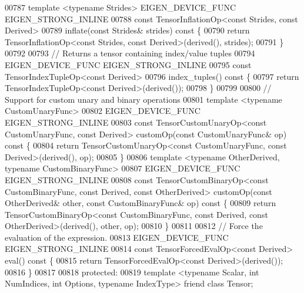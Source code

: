 \begin{DoxyCode}
00787     \textcolor{keyword}{template} <\textcolor{keyword}{typename} Str\textcolor{keywordtype}{id}es> EIGEN\_DEVICE\_FUNC EIGEN\_STRONG\_INLINE
00788     \textcolor{keyword}{const} TensorInflationOp<const Strides, const Derived>
00789     inflate(\textcolor{keyword}{const} Strides& strides)\textcolor{keyword}{ const }\{
00790       \textcolor{keywordflow}{return} TensorInflationOp<const Strides, const Derived>(derived(), strides);
00791     \}
00792 
00793     \textcolor{comment}{// Returns a tensor containing index/value tuples}
00794     EIGEN\_DEVICE\_FUNC EIGEN\_STRONG\_INLINE
00795     \textcolor{keyword}{const} TensorIndexTupleOp<const Derived>
00796     index\_tuples()\textcolor{keyword}{ const }\{
00797       \textcolor{keywordflow}{return} TensorIndexTupleOp<const Derived>(derived());
00798     \}
00799 
00800     \textcolor{comment}{// Support for custom unary and binary operations}
00801     \textcolor{keyword}{template} <\textcolor{keyword}{typename} CustomUnaryFunc>
00802     EIGEN\_DEVICE\_FUNC EIGEN\_STRONG\_INLINE
00803     \textcolor{keyword}{const} TensorCustomUnaryOp<const CustomUnaryFunc, const Derived> customOp(\textcolor{keyword}{const} CustomUnaryFunc& op)\textcolor{keyword}{
       const }\{
00804       \textcolor{keywordflow}{return} TensorCustomUnaryOp<const CustomUnaryFunc, const Derived>(derived(), op);
00805     \}
00806     \textcolor{keyword}{template} <\textcolor{keyword}{typename} OtherDerived, \textcolor{keyword}{typename} CustomBinaryFunc>
00807     EIGEN\_DEVICE\_FUNC EIGEN\_STRONG\_INLINE
00808     \textcolor{keyword}{const} TensorCustomBinaryOp<const CustomBinaryFunc, const Derived, const OtherDerived> customOp(\textcolor{keyword}{const} 
      OtherDerived& other, \textcolor{keyword}{const} CustomBinaryFunc& op)\textcolor{keyword}{ const }\{
00809       \textcolor{keywordflow}{return} TensorCustomBinaryOp<const CustomBinaryFunc, const Derived, const OtherDerived>(derived(), 
      other, op);
00810     \}
00811 
00812     \textcolor{comment}{// Force the evaluation of the expression.}
00813     EIGEN\_DEVICE\_FUNC EIGEN\_STRONG\_INLINE
00814     \textcolor{keyword}{const} TensorForcedEvalOp<const Derived> eval()\textcolor{keyword}{ const }\{
00815       \textcolor{keywordflow}{return} TensorForcedEvalOp<const Derived>(derived());
00816     \}
00817 
00818   \textcolor{keyword}{protected}:
00819     \textcolor{keyword}{template} <\textcolor{keyword}{typename} Scalar, \textcolor{keywordtype}{int} NumIndices, \textcolor{keywordtype}{int} Options, \textcolor{keyword}{typename} IndexType> \textcolor{keyword}{friend} \textcolor{keyword}{class }Tensor;

\end{DoxyCode}

